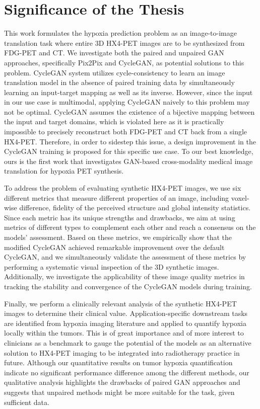 \section{Significance of the Thesis}
This work formulates the hypoxia prediction problem as an image-to-image translation task where entire 3D HX4-PET images are to be synthesized from FDG-PET and CT. We investigate both the paired and unpaired GAN approaches, specifically Pix2Pix and CycleGAN, as potential solutions to this problem. CycleGAN system utilizes cycle-consistency to learn an image translation model in the absence of paired training data by simultaneously learning an input-target mapping as well as its inverse. However, since the input in our use case is multimodal, applying CycleGAN naively to this problem may not be optimal. CycleGAN assumes the existence of a bijective mapping between the input and target domains, which is violated here as it is practically impossible to precisely reconstruct both FDG-PET and CT back from a single HX4-PET. Therefore, in order to sidestep this issue, a design improvement in the CycleGAN training is proposed for this specific use case. To our best knowledge, ours is the first work that investigates GAN-based cross-modality medical image translation for hypoxia PET synthesis.

To address the problem of evaluating synthetic HX4-PET images, we use six different metrics that measure different properties of an image, including voxel-wise difference, fidelity of the perceived structure and global intensity statistics. Since each metric has its unique strengths and drawbacks, we aim at using metrics of different types to complement each other and reach a consensus on the models' assessment. Based on these metrics, we empirically show that the modified CycleGAN achieved remarkable improvement over the default CycleGAN, and we simultaneously validate the assessment of these metrics by performing a systematic visual inspection of the 3D synthetic images. Additionally, we investigate the applicability of these image quality metrics in tracking the stability and convergence of the CycleGAN models during training.

Finally, we perform a clinically relevant analysis of the synthetic HX4-PET images to determine their clinical value. Application-specific downstream tasks are identified from hypoxia imaging literature and applied to quantify hypoxia locally within the tumors. This is of great importance and of more interest to clinicians as a benchmark to gauge the potential of the models as an alternative solution to HX4-PET imaging to be integrated into radiotherapy practice in future. Although our quantitative results on tumor hypoxia quantification indicate no significant performance difference among the different methods, our qualitative analysis highlights the drawbacks of paired GAN approaches and suggests that unpaired methods might be more suitable for the task, given sufficient data.



